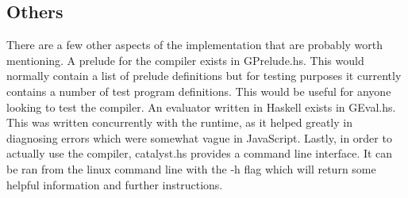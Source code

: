 \subsection{Others}
There are a few other aspects of the implementation that
are probably worth mentioning. A prelude for the compiler exists
in GPrelude.hs. This would normally contain a list of prelude
definitions but for testing purposes it currently contains a 
number of test program definitions. This would be useful for
anyone looking to test the compiler.  An evaluator written in 
Haskell exists in GEval.hs. This was written concurrently with 
the runtime, as it helped greatly in diagnosing errors which 
were somewhat vague in JavaScript. Lastly, in order to actually
use the compiler, catalyst.hs provides a command line interface.
It can be ran from the linux command line with the -h flag which
will return some helpful information and further instructions.






















